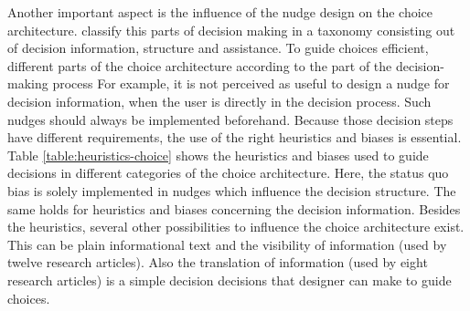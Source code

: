 Another important aspect is the influence of the nudge design on the choice architecture. \cite{munscher_review_2016} classify this parts of decision making in a taxonomy consisting out of decision information, structure and assistance. To guide choices efficient, different parts of the choice architecture according to the part of the decision-making process For example, it is not perceived as useful to design a nudge for decision information, when the user is directly in the decision process. Such nudges should always be implemented beforehand. Because those decision steps have different requirements, the use of the right heuristics and biases is essential. Table \ref{table:heuristics-choice} shows the heuristics and biases used to guide decisions in different categories of the choice architecture. Here, the status quo bias is solely implemented in nudges which influence the decision structure. The same holds for heuristics and biases concerning the decision information. Besides the heuristics, several other possibilities to influence the choice architecture exist. This can be plain informational text and the visibility of information (used by twelve research articles). Also the translation of information (used by eight research articles) is a simple decision decisions that designer can make to guide choices. 

